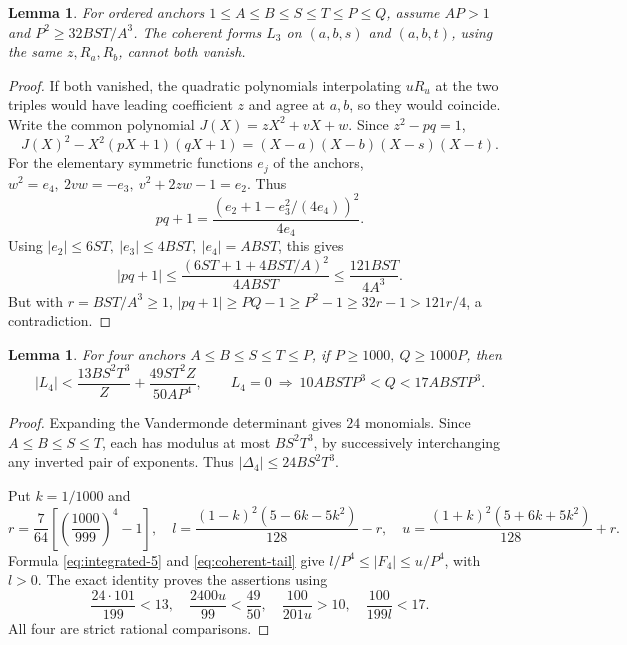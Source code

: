 \documentclass[12pt]{article}
\newtheorem{lemma}[theorem]{Lemma}
\numberwithin{equation}{section}
\begin{document}
\begin{lemma}\label{lem:four-anchor-nonvanishing}
For ordered anchors \(1\le A\le B\le S\le T\le P\le Q\), assume
\(AP>1\) and \(P^2\ge32BST/A^3\). The coherent forms \(L_3\) on
\((a,b,s)\) and \((a,b,t)\), using the same \(z,R_a,R_b\), cannot both vanish.
\end{lemma}
\begin{proof}
If both vanished, the quadratic polynomials interpolating \(uR_u\)
at the two triples would have leading coefficient \(z\) and agree at
\(a,b\), so they would coincide. Write the common polynomial
\(J(X)=zX^2+vX+w\). Since \(z^2-pq=1\),
\[
 J(X)^2-X^2(pX+1)(qX+1)=(X-a)(X-b)(X-s)(X-t).
\]
For the elementary symmetric functions \(e_j\) of the anchors,
\(w^2=e_4,\ 2vw=-e_3,\ v^2+2zw-1=e_2\). Thus
\[
 pq+1=\frac{(e_2+1-e_3^2/(4e_4))^2}{4e_4}.
\]
Using \(|e_2|\le6ST,\ |e_3|\le4BST,\ |e_4|=ABST\), this gives
\[
 |pq+1|\le\frac{(6ST+1+4BST/A)^2}{4ABST}
 \le\frac{121BST}{4A^3}.
\]
But with \(r=BST/A^3\ge1\),
\(|pq+1|\ge PQ-1\ge P^2-1\ge32r-1>121r/4\), a contradiction.
\end{proof}

\begin{lemma}\label{lem:direct-four}
For four anchors \(A\le B\le S\le T\le P\), if
\(P\ge1000,\ Q\ge1000P\), then
\[
 |L_4|<\frac{13BS^2T^3}{Z}+\frac{49ST^2Z}{50AP^4},\qquad
 L_4=0\ \Longrightarrow\ 10ABSTP^3<Q<17ABSTP^3.
\]
\end{lemma}
\begin{proof}
Expanding the Vandermonde determinant gives \(24\) monomials.
Since \(A\le B\le S\le T\), each has modulus at most
\(BS^2T^3\), by successively interchanging any inverted pair of
exponents. Thus \(|\Delta_4|\le24BS^2T^3\).

Put \(k=1/1000\) and
\[
 r=\frac7{64}\left[\left(\frac{1000}{999}\right)^4-1\right],\quad
 l=\frac{(1-k)^2(5-6k-5k^2)}{128}-r,\quad
 u=\frac{(1+k)^2(5+6k+5k^2)}{128}+r.
\]
Formula \eqref{eq:integrated-5} and \eqref{eq:coherent-tail} give
\(l/P^4\le|F_4|\le u/P^4\), with \(l>0\).
The exact identity proves the assertions using
\[
 \frac{24\cdot101}{199}<13,\quad
 \frac{2400u}{99}<\frac{49}{50},\quad
 \frac{100}{201u}>10,\quad \frac{100}{199l}<17.
\]
All four are strict rational comparisons.
\end{proof}
\end{document}
